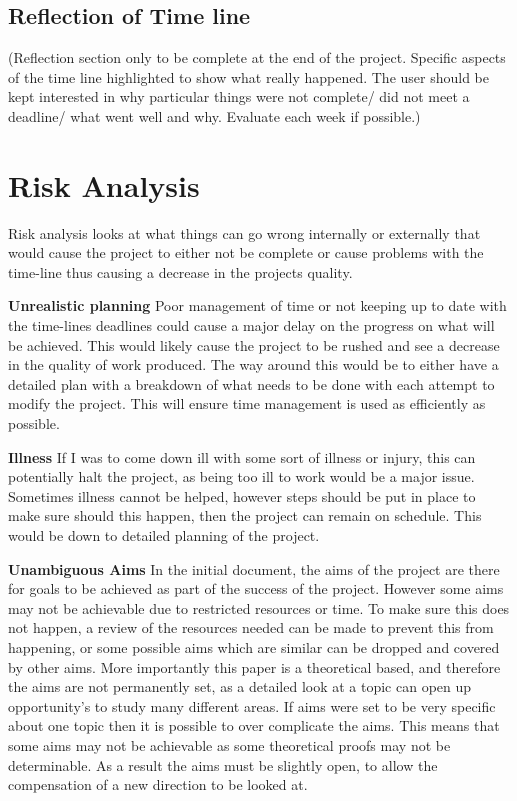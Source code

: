 \documentclass[11pt,a4paper]{report}
\begin{document}
\subsection{Reflection of Time line}
(Reflection section only to be complete at the end of the project. Specific aspects of the time line highlighted to show what really happened. The user should be kept interested in why particular things were not complete/ did not meet a deadline/ what went well and why. Evaluate each week if possible.)

\section{Risk Analysis}
Risk analysis looks at what things can go wrong internally or externally that would cause the project to either not be complete or cause problems with the time-line thus causing a decrease in the projects quality.


\textbf{Unrealistic planning} \newline
Poor management of time or not keeping up to date with the time-lines deadlines could cause a major delay on the progress on what will be achieved. This would likely cause the project to be rushed and see a decrease in the quality of work produced. The way around this would be to either have a detailed plan with a breakdown of what needs to be done with each attempt to modify the project. This will ensure time management is used as efficiently as possible. 

\textbf{Illness} \newline
If I was to come down ill with some sort of illness or injury, this can potentially halt the project, as being too ill to work would be a major issue. Sometimes illness cannot be helped, however steps should be put in place to make sure should this happen, then the project can remain on schedule. This would be down to detailed planning of the project.


\textbf{Unambiguous Aims}\newline
In the initial document, the aims of the project are there for goals to be achieved as part of the success of the project. However some aims may not be achievable due to restricted resources or time.
To make sure this does not happen, a review of the resources needed can be made to prevent this from happening, or some possible aims which are similar can be dropped and covered by other aims. More importantly this paper is a theoretical based, and therefore the aims are not permanently set, as a detailed look at a topic can open up opportunity's to study many different areas. If aims were set to be very specific about one topic then it is possible to over complicate the aims. This means that some aims may not be achievable as some theoretical proofs may not be determinable. As a result the aims must be slightly open, to allow the compensation of a new direction to be looked at.
\end{document}
